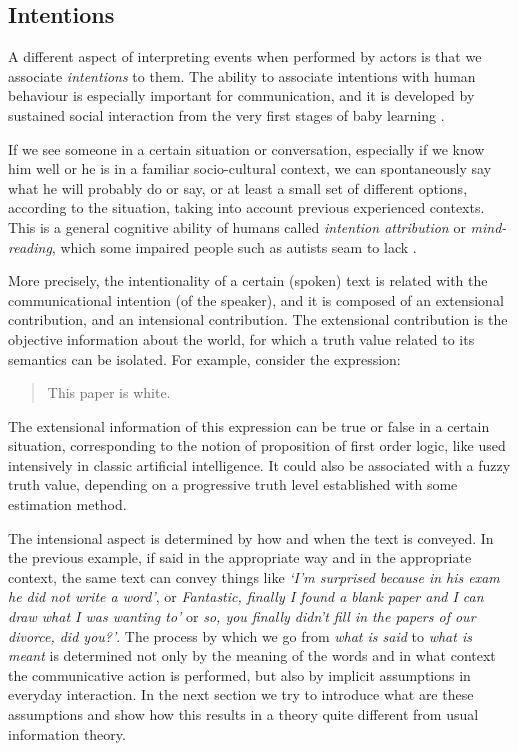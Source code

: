 \documentclass[
		twoside,openright,titlepage,numbers=noenddot,manychapters,
		headinclude,%
                footinclude=false,cleardoublepage=empty,
                BCOR=5mm,
		fontsize=11pt, %
                 enabledeprecatedfontcommands]{scrreprt}
\begin{document}
\subsection{Intentions}
A different aspect of interpreting events when performed by actors is that we associate \emph{intentions} to them. The ability to associate intentions with human behaviour is especially important for  communication, and it is developed by sustained social interaction from the very first stages of baby learning \cite[]{halliday1985saw,tomasello2003clu}.

If we see someone in a certain situation or conversation, especially if we know him well or he is in a familiar socio-cultural context, we can spontaneously say what he will probably do or say, or at least a small set of different options, according to the situation, taking into account previous experienced contexts. This is a general cognitive ability of humans called \emph{intention attribution} or \emph{mind-reading}, which some impaired people such as autists seam to lack \cite[]{baron2000understanding}. 

More precisely, the intentionality of a certain (spoken) text is related with the communicational intention (of the speaker), and it is composed of an extensional contribution, and an intensional contribution. The extensional contribution is the objective information about the world, for which a truth value related to its semantics can be isolated. For example, consider the expression:
\begin{quote}
This paper is white.
\end{quote}
The extensional information of this expression can be true or false in a certain situation, corresponding to the notion of proposition of first order logic, like used intensively in classic artificial intelligence. It could also be associated with a fuzzy truth value, depending on a progressive truth level established with some estimation method.

The intensional aspect is determined by how and when the text is conveyed. In the previous example, if said in the appropriate way and in the appropriate context, the same text can convey things like \emph{`I’m surprised because in his exam he did not write a word'}, or \emph{Fantastic, finally I found a blank paper and I can draw what I was wanting to'} or \emph{so, you finally didn’t fill in the papers of our divorce, did you?'}. The process by which we go from \emph{what is said} to \emph{what is meant} is determined not only by the meaning of the words and in what context the communicative action is performed, but also by  implicit assumptions in everyday interaction. In the next section we try to introduce what are these assumptions and show how this results in a theory quite different from usual information theory.%
\end{document}
